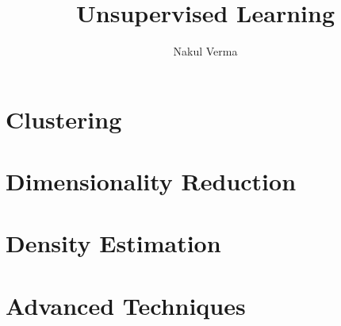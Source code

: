 \documentclass[11pt]{book}
\title{Unsupervised Learning}
\author{Nakul Verma}
\date{}
\begin{document}
\maketitle
\tableofcontents

\part{Clustering}



\part{Dimensionality Reduction}




\part{Density Estimation}




\part{Advanced Techniques}

\end{document}
